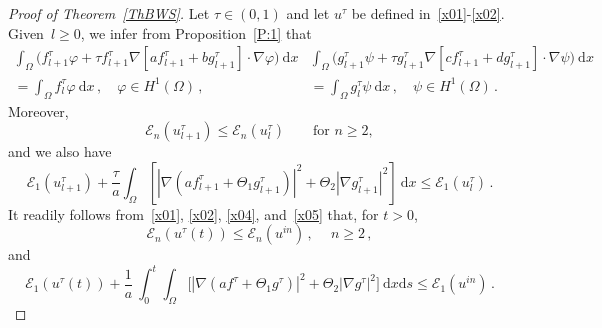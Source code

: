 \documentclass[AHL,Unicode,longabstracts,published]{cedram}
\newcommand{\clE}{\mathcal{E}}
\newcommand{\rmd}{\mathrm{d}}
\newcommand{\clE}{\mathcal{E}}
\begin{document}
\begin{proof}[Proof of Theorem~\ref{ThBWS}]
Let $\tau\in (0,1)$ and let $u^\tau$ be defined in~\eqref{x01}-\eqref{x02}. Given~${l\ge 0}$, we infer from Proposition~\ref{P:1} that
\begin{subequations}\label{x03}
\begin{multline}\label{x03a}
\int_\Omega \Big(f_{l+1}^\tau \varphi + \tau f_{l+1}^\tau \nabla\left[af_{l+1}^\tau + b g_{l+1}^\tau\right] \cdot\nabla \varphi \Big)\ \rmd x \\
= \int_\Omega f_{l}^\tau \varphi\ \rmd x\,, \quad \varphi\in H^1(\Omega)\,, 
\end{multline}
\begin{multline}\label{x03b}
\int_\Omega \Big(g_{l+1}^\tau \psi + \tau g_{l+1}^\tau \nabla\left[cf_{l+1}^\tau + dg_{l+1}^\tau\right] \cdot\nabla\psi \Big)\ \rmd x \\
= \int_\Omega g_{l}^\tau \psi\ \rmd x\,, \quad \psi\in H^1(\Omega)\,. 
\end{multline}
\end{subequations}
Moreover,
\begin{equation}\label{x04}
\clE_n(u_{l+1}^\tau) \le \clE_n(u_{l}^\tau)\qquad\text{for }n\ge 2, 
\end{equation}
and we also have
\begin{equation}\label{x05}
\clE_1(u_{l+1}^\tau) +\frac{ \tau}{a} \int_\Omega \left[\left|\nabla \left(a f_{l+1}^\tau + \Theta_1g_{l+1}^\tau\right)\right|^2+\Theta_2\left|\nabla g_{l+1}^\tau\right|^2\right]\ \rmd x \le\clE_1(u_{l}^\tau)\,. 
\end{equation}
It readily follows from~\eqref{x01}, \eqref{x02}, \eqref{x04}, and~\eqref{x05} that, for $t>0$,
\begin{equation}\label{x06}
\clE_n(u^\tau(t)) \le \clE_n (u^{in}) \,, \quad \ n\ge 2\,, 
\end{equation}
and
\begin{equation}\label{x07}
\clE_1(u^\tau(t)) +\frac{ 1}{a} \ \int_0^t \int_\Omega \big[\left|\nabla \left(a f^\tau + \Theta_1g^\tau\right)\right|^2+\Theta_2\left|\nabla g^\tau\right|^2\big]\ \rmd x\rmd s \le \clE_1(u^{in})\,. 
\end{equation}


\end{proof}
\end{document}
